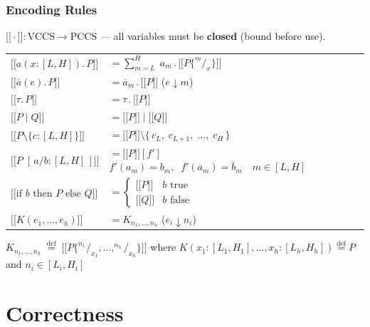 \documentclass[t]{beamer}
\newcommand{\llbracket}{\mathopen{[\![}}
\newcommand{\rrbracket}{\mathclose{]\!]}}
\newcommand{\enc}[1]{\llbracket #1 \rrbracket}
\begin{document}
  \begin{frame}
    \frametitle{Encoding Rules}

    $\enc{\cdot} : \text{VCCS} \to \text{PCCS}$ \quad — all variables must be \textbf{closed} (bound before use).

    \vspace{0.2cm}

    \begin{tabular}{ll}
      $\enc{a(x{:}[L,H]).\,P}$
        &$= \displaystyle\sum_{m=L}^{H}\; a_m \,.\, \enc{P\{^m/_x\}}$ \\[8pt]
      $\enc{\overline{a}(e).\,P}$
        &$= \overline{a}_m \,.\, \enc{P}$ \quad ($e \!\downarrow\! m$) \\[4pt]
      $\enc{\tau.\,P}$
        &$= \tau \,.\, \enc{P}$ \\[4pt]
      $\enc{P \mid Q}$
        &$= \enc{P} \mid \enc{Q}$ \\[4pt]
      $\enc{P \setminus \{c{:}[L,H]\}}$
        &$= \enc{P} \setminus \{\,c_L,\; c_{L+1},\; \ldots,\; c_H\,\}$ \\[4pt]
      $\enc{P\;[\,a / b {:} [L,H]\,]}$
        &$= \enc{P}[f']$ \quad $f'(a_m)=b_m,\;\; f'(\overline{a}_m)=\overline{b}_m \quad m \in [L,H]$ \\[4pt]
      $\enc{\text{if } b \text{ then } P \text{ else } Q}$
        &$= \begin{cases} \enc{P} & b \text{ true} \\ \enc{Q} & b \text{ false}\end{cases}$ \\[8pt]
      $\enc{K(e_1,\ldots,e_h)}$
        &$= K_{n_1,\ldots,n_h}$ \quad ($e_i \!\downarrow\! n_i$) \\[4pt]
    \end{tabular}

    \vspace{0.15cm}
    \small $K_{n_1,\ldots,n_h} \;\overset{\text{def}}{=}\; \enc{P\{^{n_1}/_{x_1},\ldots,^{n_h}/_{x_h}\}}$
    \quad where $K(x_1{:}[L_1,H_1],\ldots,x_h{:}[L_h,H_h]) \overset{\text{def}}{=} P$ and $n_i \in [L_i, H_i]$

  \end{frame}

\section{Correctness}
\end{document}
